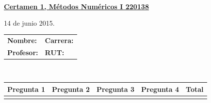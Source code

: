 \documentclass[11pt]{article}
\begin{document}
\hspace*{-1,5cm}

\vspace*{0.5cm} \centerline {\bf\underline{Certamen 1, M\'etodos Num\'ericos I 220138 }}
\centerline{\textrm{14 de junio 2015.}}  \vspace{0.2cm}


\begin{center}
 \begin{tabular}{p{}p{}}
	\textbf{Nombre:}   &\textbf{Carrera:}\\
	\textbf{Profesor:} & \textbf{ RUT:}
 \end{tabular}
 \\
 \vspace{0.2cm}
 \begin{tabular}{||p{2cm}|p{2.1cm}|p{2.1cm}|p{2.1cm}||p{2cm}||}
 \hline
 Pregunta 1 &  Pregunta 2 &    Pregunta 3 & Pregunta 4 & Total\\
 \hline
 \vspace{1.5cm} & & & &   \\
 \hline
 \end{tabular}
 \end{center}
\end{document}
